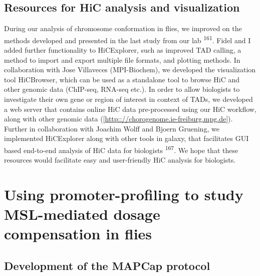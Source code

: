 \documentclass[11pt,twoside]{MPIthesis}
\theoremstyle{definition}
\theoremstyle{definition}
\theoremstyle{definition}
\theoremstyle{remark}
\begin{document}
\subsection{Resources for HiC analysis and
visualization}\label{resources-for-hic-analysis-and-visualization}

During our analysis of chromosome conformation in flies, we improved on
the methods developed and presented in the last study from our lab
\textsuperscript{161}. Fidel and I added further functionality to
HiCExplorer, such as improved TAD calling, a method to import and export
multiple file formats, and plotting methods. In collaboration with Jose
Villaveces (MPI-Biochem), we developed the visualization tool
HiCBrowser, which can be used as a standalone tool to browse HiC and
other genomic data (ChIP-seq, RNA-seq etc.). In order to allow
biologists to investigate their own gene or region of interest in
context of TADs, we developed a web server that contains online HiC data
pre-processed using our HiC workflow, along with other genomic data
({[}{\url{http:://chorogenome.ie-freiburg.mpg.de}}{]}). Further in
collaboration with Joachim Wolff and Bjoern Gruening, we implemented
HiCExplorer along with other tools in galaxy, that facilitates GUI based
end-to-end analysis of HiC data for biologists \textsuperscript{167}. We
hope that these resources would facilitate easy and user-friendly HiC
analysis for biologists.

\section{Using promoter-profiling to study MSL-mediated dosage
compensation in
flies}\label{using-promoter-profiling-to-study-msl-mediated-dosage-compensation-in-flies}

\subsection{Development of the MAPCap
protocol}\label{development-of-the-mapcap-protocol}
\end{document}
